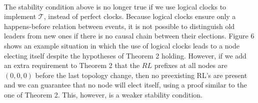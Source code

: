 \paragraph{}The stability condition above is no longer true if we use logical clocks to implement $\mathcal{T}$, instead of perfect clocks. Because logical clocks ensure only a happens-before relation between events, it is not possible to distinguish old leaders from new ones if there is no causal chain between their elections. Figure 6 shows an example situation in which the use of logical clocks leads to a node electing itself despite the hypotheses of Theorem 2 holding. However, if we add an extra requirement to Theorem 2 that the $RL$ prefixes at all nodes are $(0, 0, 0)$ before the last topology change, then no preexisting RL’s are present and we can guarantee that no node will elect itself, using a proof similar to the one of Theorem 2. This, however, is a weaker stability condition.
